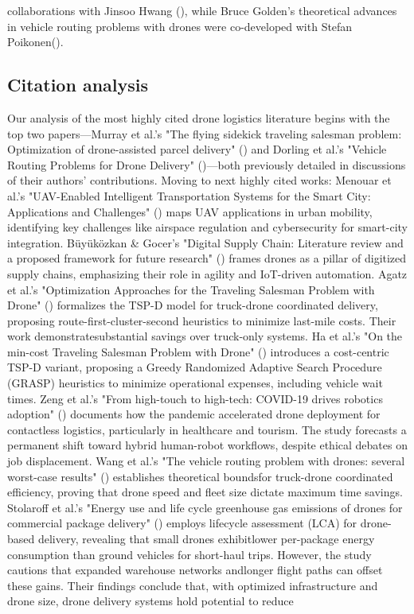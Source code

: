 \documentclass{article}
\begin{document}
collaborations with Jinsoo Hwang (\cite{WOS:000514800800001, WOS:000605628800016, WOS:000623397300001}), while Bruce Golden’s theoretical advances in vehicle routing problems with drones were co-developed with Stefan Poikonen(\cite{WOS:000400384200003, WOS:000468604000010}).

\subsection{Citation analysis}
Our analysis of the most highly cited drone logistics literature begins with the ​​top two papers​​—Murray et al.'s "The flying sidekick traveling salesman problem: Optimization of drone-assisted parcel delivery" (\cite{WOS:000353871700006}) and Dorling et al.'s "Vehicle Routing Problems for Drone Delivery" (\cite{WOS:000623397300001})—both previously detailed in discussions of their authors' contributions. Moving to next highly cited works: ​​Menouar et al.'s "UAV-Enabled Intelligent Transportation Systems for the Smart City: Applications and Challenges" (\cite{WOS:000398037700003}) maps UAV applications in urban mobility, identifying key challenges like airspace regulation and cybersecurity for smart-city integration. ​​Büyüközkan & Gocer's "Digital Supply Chain: Literature review and a proposed framework for future research" (\cite{WOS:000432504700016}) frames drones as a pillar of digitized supply chains, emphasizing their role in agility and IoT-driven automation. Agatz et al.'s "Optimization Approaches for the Traveling Salesman Problem with Drone" (\cite{WOS:000442591800013})​​ formalizes the ​​TSP-D​​ model for truck-drone coordinated delivery, proposing ​​route-first-cluster-second heuristics​​ to minimize last-mile costs. Their work demonstrate ​​substantial savings​​ over truck-only systems. Ha et al.'s "On the min-cost Traveling Salesman Problem with Drone" (\cite{WOS:000442591800013}) introduces a ​​cost-centric TSP-D variant​​, proposing ​​a Greedy Randomized Adaptive Search Procedure (GRASP) heuristics​​ to minimize operational expenses, including vehicle wait times. Zeng et al.'s "From high-touch to high-tech: COVID-19 drives robotics adoption" (\cite{WOS:000534121800001}) documents how the pandemic accelerated drone deployment for ​​contactless logistics​​, particularly in healthcare and tourism. The study forecasts a ​​permanent shift​​ toward hybrid human-robot workflows, despite ethical debates on job displacement. ​​Wang et al.'s "The vehicle routing problem with drones: several worst-case results" (\cite{WOS:000400384200003}) establishes ​​theoretical bounds​​ for truck-drone coordinated efficiency, proving that drone speed and fleet size dictate maximum time savings. Stolaroff et al.'s "Energy use and life cycle greenhouse gas emissions of drones for commercial package delivery" (\cite{WOS:000424872000001}) employs ​​lifecycle assessment (LCA)​​ for drone-based delivery, revealing that small drones exhibit ​​lower per-package energy consumption​​ than ground vehicles for short-haul trips. However, the study cautions that expanded ​​warehouse networks and ​​longer flight paths can offset these gains. Their findings conclude that, ​​with optimized infrastructure and drone size​​, drone delivery systems hold potential to reduce 
\end{document}

